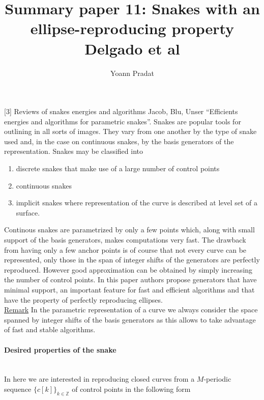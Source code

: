 \documentclass[a4paper, 11pt]{article}
\begin{document}
\title{Summary paper 11: Snakes with an ellipse-reproducing property Delgado et al}
\author{Yoann Pradat}
\maketitle

[3] Reviews of snakes energies and algorithms Jacob, Blu, Unser “Efficients energies and algorithms for parametric 
snakes”. Snakes are popular tools for outlining in all sorts of images. They vary from one another by the type of snake 
used and, in the case on continuous snakes, by the basis generators of the representation. Snakes may be classified into

\begin{enumerate}
  \item discrete snakes that make use of a large number of control points
  \item continuous snakes
  \item implicit snakes where representation of the curve is described at level set of a surface.
\end{enumerate}

Continous snakes are parametrized by only a few points which, along with small support of the basis generators, makes 
computations very fast. The drawback from having only a few anchor points is of course that not every curve can be 
represented, only those in the span of integer shifts of the generators are perfectly reproduced. However good 
approximation can be obtained by simply increasing the number of control points. In this paper authors propose 
generators that have minimal support, an important feature for fast and efficient algorithms and that have the property 
of perfectly reproducing ellipses. \\

\underline{Remark} In the parametric representation of a curve we always consider the space spanned by integer shifts of 
the basis generators as this allows to take advantage of fast and stable algorithms.

\paragraph{Desired properties of the snake} \mbox{} \\

In here we are interested in reproducing closed curves from a $M$-periodic sequence ${\{c[k]\}}_{k \in \mathbb{Z}}$ of 
control points in the following form
\end{document}
